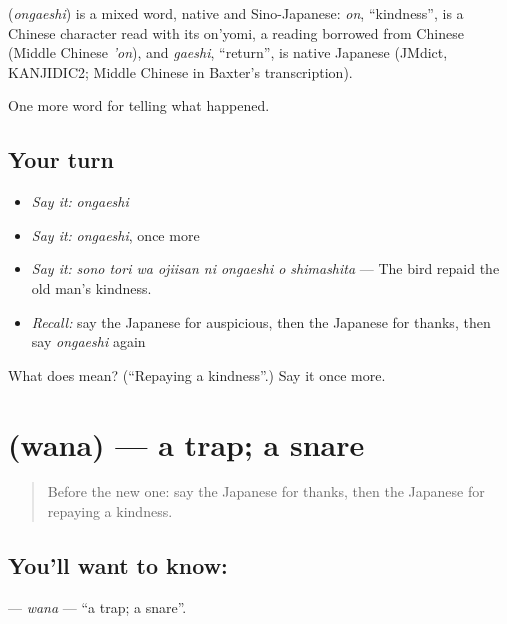 \begin{cousinweb}
\textbf{} (\emph{ongaeshi}) is a mixed word, native and Sino-Japanese: \emph{on}, \textquotedblleft{}kindness\textquotedblright{}, is a Chinese character read with its on'yomi, a reading borrowed from Chinese (Middle Chinese \emph{'on}), and \emph{gaeshi}, \textquotedblleft{}return\textquotedblright{}, is native Japanese (JMdict, KANJIDIC2; Middle Chinese in Baxter's transcription).
\end{cousinweb}

\begin{grammarlens}[title={What you've built}]
One more word for telling what happened.
\end{grammarlens}

\subsection*{Your turn}
\begin{itemize}
\raggedright
  \item \emph{Say it:} \emph{ongaeshi}
  \item \emph{Say it:} \emph{ongaeshi}, once more
  \item \emph{Say it:} \emph{sono tori wa ojiisan ni ongaeshi o shimashita} — The bird repaid the old man's kindness.
  \item \emph{Recall:} say the Japanese for auspicious, then the Japanese for thanks, then say \emph{ongaeshi} again
\end{itemize}

\begin{tcolorbox}[breakable,colback=teal!4,colframe=teal!35!black,title={Before you move on}]
What does  mean? (\textquotedblleft{}Repaying a kindness\textquotedblright{}.) Say it once more.
\end{tcolorbox}
\section[\texorpdfstring{\ja{わな} (wana)}{わな (wana)}]{ (wana) — a trap; a snare}

\label{lesson:JA-C304-wana}



\begin{quote}
Before the new one: say the Japanese for thanks, then the Japanese for repaying a kindness.
\end{quote}

\subsection*{You'll want to know: }
\textbf{} — \emph{wana} — \textquotedblleft{}a trap; a snare\textquotedblright{}.

